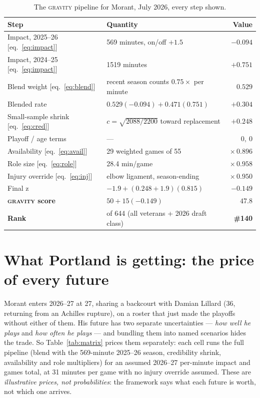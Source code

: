 \documentclass[11pt]{article}
\newcommand{\gravity}{\textsc{gravity}}
\begin{document}
\begin{table}[h]
\centering\small
\caption{The \gravity{} pipeline for Morant, July 2026, every step shown.}
\begin{tabular}{llr}
\toprule
Step & Quantity & Value \\
\midrule
Impact, 2025--26 [eq.~\ref{eq:impact}] & 569 minutes, on/off $+1.5$ & $-0.094$ \\
Impact, 2024--25 [eq.~\ref{eq:impact}] & 1519 minutes & $+0.751$ \\
Blend weight [eq.~\ref{eq:blend}] & recent season counts $0.75\times$ per minute & $0.529$ \\
Blended rate & $0.529(-0.094) + 0.471(0.751)$ & $+0.304$ \\
Small-sample shrink [eq.~\ref{eq:cred}] & $c=\sqrt{2088/2200}$ toward replacement & $+0.248$ \\
Playoff / age terms & --- & $0,\ 0$ \\
Availability [eq.~\ref{eq:avail}] & 29 weighted games of 55 & $\times\,0.896$ \\
Role size [eq.~\ref{eq:role}] & 28.4 min/game & $\times\,0.958$ \\
Injury override [eq.~\ref{eq:inj}] & elbow ligament, season-ending & $\times\,0.950$ \\
Final z & $-1.9 + (0.248+1.9)(0.815)$ & $-0.149$ \\
\midrule
\textbf{\gravity{} score} & $50 + 15(-0.149)$ & $\mathbf{47.8}$ \\
\textbf{Rank} & of 644 (all veterans + 2026 draft class) & \textbf{\#140} \\
\bottomrule
\end{tabular}
\label{tab:pipeline}
\end{table}

\section{What Portland is getting: the price of every future}
\label{sec:prognosis}

Morant enters 2026--27 at 27, sharing a backcourt with Damian Lillard (36, returning
from an Achilles rupture), on a roster that just made the playoffs without either of
them. His future has two separate uncertainties --- \emph{how well he plays} and
\emph{how often he plays} --- and bundling them into named scenarios hides the trade.
So Table~\ref{tab:matrix} prices them separately: each cell runs the full pipeline
(blend with the 569-minute 2025--26 season, credibility shrink, availability and role
multipliers) for an assumed 2026--27 per-minute impact and games total, at 31 minutes
per game with no injury override assumed. These are \emph{illustrative prices, not
probabilities}: the framework says what each future is worth, not which one arrives.
\end{document}
